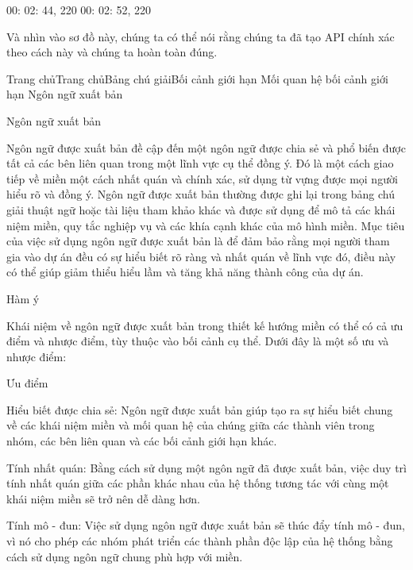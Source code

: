 00: 02: 44, 220 00: 02: 52, 220

Và nhìn vào sơ đồ này, chúng ta có thể nói rằng chúng ta đã tạo API chính xác theo cách này và chúng ta hoàn toàn đúng.
 





Trang chủTrang chủBảng chú giảiBối cảnh giới hạn Mối quan hệ bối cảnh giới hạn Ngôn ngữ xuất bản

Ngôn ngữ xuất bản

Ngôn ngữ được xuất bản đề cập đến một ngôn ngữ được chia sẻ và phổ biến được tất cả các bên liên quan trong một lĩnh vực cụ thể đồng ý. Đó là một cách giao tiếp về miền một cách nhất quán và chính xác, sử dụng từ vựng được mọi người hiểu rõ và đồng ý. Ngôn ngữ được xuất bản thường được ghi lại trong bảng chú giải thuật ngữ hoặc tài liệu tham khảo khác và được sử dụng để mô tả các khái niệm miền, quy tắc nghiệp vụ và các khía cạnh khác của mô hình miền. Mục tiêu của việc sử dụng ngôn ngữ được xuất bản là để đảm bảo rằng mọi người tham gia vào dự án đều có sự hiểu biết rõ ràng và nhất quán về lĩnh vực đó, điều này có thể giúp giảm thiểu hiểu lầm và tăng khả năng thành công của dự án.

Hàm ý

Khái niệm về ngôn ngữ được xuất bản trong thiết kế hướng miền có thể có cả ưu điểm và nhược điểm, tùy thuộc vào bối cảnh cụ thể. Dưới đây là một số ưu và nhược điểm:

Ưu điểm

Hiểu biết được chia sẻ: Ngôn ngữ được xuất bản giúp tạo ra sự hiểu biết chung về các khái niệm miền và mối quan hệ của chúng giữa các thành viên trong nhóm, các bên liên quan và các bối cảnh giới hạn khác.

Tính nhất quán: Bằng cách sử dụng một ngôn ngữ đã được xuất bản, việc duy trì tính nhất quán giữa các phần khác nhau của hệ thống tương tác với cùng một khái niệm miền sẽ trở nên dễ dàng hơn.

Tính mô - đun: Việc sử dụng ngôn ngữ được xuất bản sẽ thúc đẩy tính mô - đun, vì nó cho phép các nhóm phát triển các thành phần độc lập của hệ thống bằng cách sử dụng ngôn ngữ chung phù hợp với miền.


